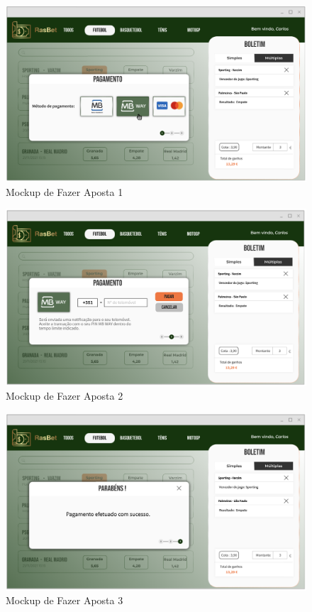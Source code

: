 \begin{figure}[H]
\centering
\includegraphics[width=1\textwidth]{imagens/ambitoProduto/Mockups/M_Apostar1.png}
\caption{Mockup de Fazer Aposta 1}
\end{figure}
\begin{figure}[H]
\centering
\includegraphics[width=1\textwidth]{imagens/ambitoProduto/Mockups/M_Apostar2.png}
\caption{Mockup de Fazer Aposta 2}
\end{figure}
\begin{figure}[H]
\centering
\includegraphics[width=1\textwidth]{imagens/ambitoProduto/Mockups/M_Apostar3.png}
\caption{Mockup de Fazer Aposta 3}
\end{figure}


